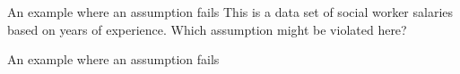 \documentclass{beamer}\usepackage[]{graphicx}\usepackage[]{color}
\newenvironment{knitrout}{}{} %
\begin{document}
\begin{darkframes}
    \begin{frame}{An example where an assumption fails}
      This is a data set of social worker salaries based on years of experience. Which assumption might be violated here?
\begin{knitrout}


\end{knitrout}
    \end{frame}

    \begin{frame}{An example where an assumption fails}
\begin{knitrout}


\end{knitrout}
    \end{frame}

  \end{darkframes}
\end{document}
